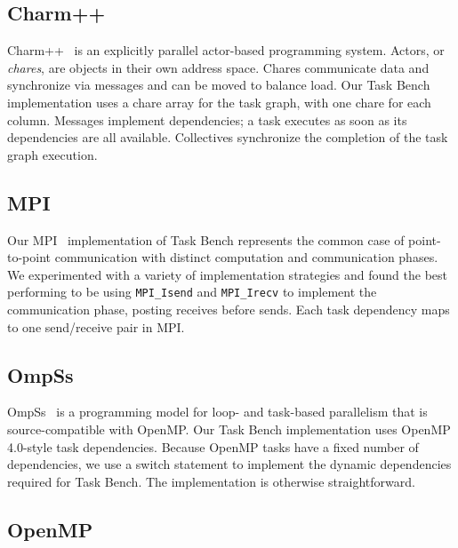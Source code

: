 \subsection{Charm++}

Charm++~\cite{Charmpp93} is an explicitly parallel actor-based programming system. Actors, or
\emph{chares}, are objects in their own address space.
Chares communicate data and synchronize via messages and can be moved
to balance load. Our Task Bench implementation uses a chare
array for the task graph, with one chare for each column. Messages implement dependencies; a task executes as soon as its
dependencies are all available. Collectives synchronize the
completion of the task graph execution.



\subsection{MPI}


Our MPI~\cite{MPI} implementation of Task Bench represents the common
case of point-to-point communication with distinct computation and
communication phases. We experimented with a variety of implementation
strategies and found the best performing to be using
\lstinline[language=C++]{MPI_Isend} and
\lstinline[language=C++]{MPI_Irecv} to implement the communication
phase, posting receives before sends. Each task dependency maps to one
send/receive pair in MPI.

\subsection{OmpSs}

OmpSs~\cite{OmpSs11} is a programming model for loop- and task-based parallelism
that is source-compatible with OpenMP. Our Task Bench implementation
uses OpenMP 4.0-style task dependencies. Because OpenMP tasks have a fixed number of dependencies, we use a switch
statement to implement the dynamic dependencies required for Task
Bench. The implementation is otherwise straightforward.


\subsection{OpenMP}

